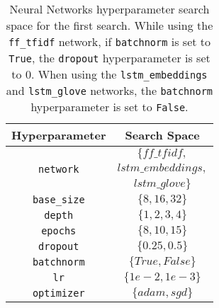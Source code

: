 \begin{table}[H]
    \centering
    \begin{tabular}{|c|c|}
        \hline

        \textbf{Hyperparameter} &
        \textbf{Search Space} \\

        \hline

        \multirow{3}{*}{\texttt{network}} &
        $\{ff\_tfidf,$ \\ 
        & $lstm\_embeddings,$ \\
        & $lstm\_glove\}$ \\

        \hline

        \texttt{base\_size} &
        $\{8, 16, 32\}$ \\

        \hline

        \texttt{depth} &
        $\{1, 2, 3, 4\}$ \\

        \hline

        \texttt{epochs} &
        $\{8, 10, 15\}$ \\

        \hline

        \texttt{dropout} &
        $\{0.25, 0.5\}$ \\

        \hline

        \texttt{batchnorm} &
        $\{True, False\}$ \\

        \hline

        \texttt{lr} &
        $\{1e-2, 1e-3\}$ \\

        \hline

        \texttt{optimizer} &
        $\{adam, sgd\}$ \\

        \hline
    \end{tabular}
    \caption{Neural Networks hyperparameter 
    search space for the first search. 
    While using the 
    \texttt{ff\_tfidf} network, if 
    \texttt{batchnorm} is set to \texttt{True},
    the \texttt{dropout} hyperparameter is set to
    $0$. When using the 
    \texttt{lstm\_embeddings} and 
    \texttt{lstm\_glove} networks, the
    \texttt{batchnorm} hyperparameter is
    set to \texttt{False}.}
    \label{tab:nn_search_spaces_1}
\end{table}

